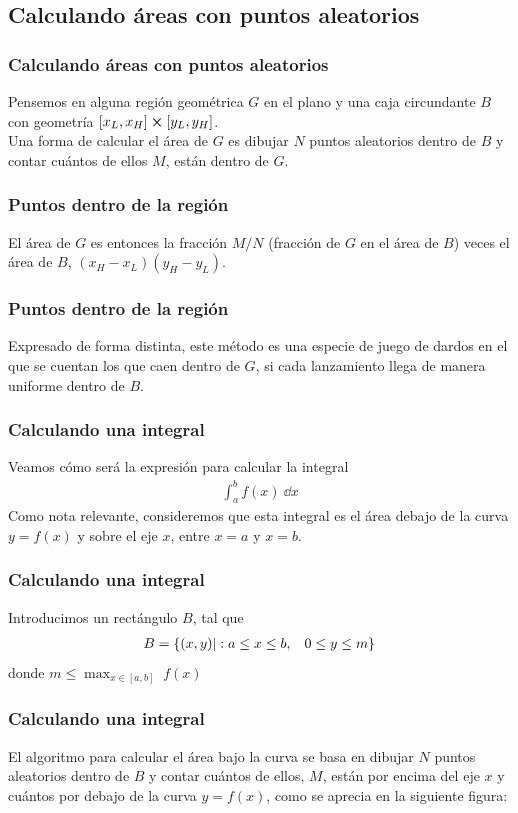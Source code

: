 \subsection{Calculando áreas con puntos aleatorios}
\begin{frame}
\frametitle{Calculando áreas con puntos aleatorios}
Pensemos en alguna región geométrica $G$ en el plano y una caja circundante $B$ con geometría $[x_{L}, x_{H}] \cp [y_{L}, y_{H}]$.
\\
\bigskip
Una forma de calcular el área de $G$ es dibujar $N$ puntos aleatorios dentro de $B$ y contar cuántos de ellos $M$, están dentro de $G$.
\end{frame}
\begin{frame}
\frametitle{Puntos dentro de la región}
El área de $G$ es entonces la fracción $M/N$ (fracción de $G$ en el área de $B$) veces el área de $B$, $(x_{H} - x_{L})(y_{H} - y_{L})$.
\end{frame}
\begin{frame}
\frametitle{Puntos dentro de la región}
Expresado de forma distinta, este método es una especie de juego de dardos en el que se cuentan los que caen dentro de $G$, si cada lanzamiento llega de manera uniforme dentro de $B$.
\end{frame}
\begin{frame}
\frametitle{Calculando una integral}
Veamos cómo será la expresión para calcular la integral
\begin{align*}
\int_{a}^{b} f(x) \: \dd{x}
\end{align*}
\pause
Como nota relevante, consideremos que esta integral es el área debajo de la curva $y = f(x)$ y sobre el eje $x$, entre $x = a$ y $x = b$.
\end{frame}
\begin{frame}
\frametitle{Calculando una integral}
Introducimos un rectángulo $B$, tal que
\begin{align*}
B = \{ (x, y) \vert : a \leq x \leq b, \hspace{0.3cm} 0 \leq y \leq m \}
\end{align*}
donde $m \leq \max_{x \in [a, b]} \; f(x)$
\end{frame}
\begin{frame}
\frametitle{Calculando una integral}
El algoritmo para calcular el área bajo la curva se basa en dibujar $N$ puntos aleatorios dentro de $B$ y contar cuántos de ellos, $M$, están por encima del eje $x$  y cuántos por debajo de la curva $y = f(x)$, como se aprecia en la siguiente figura:
\end{frame}
